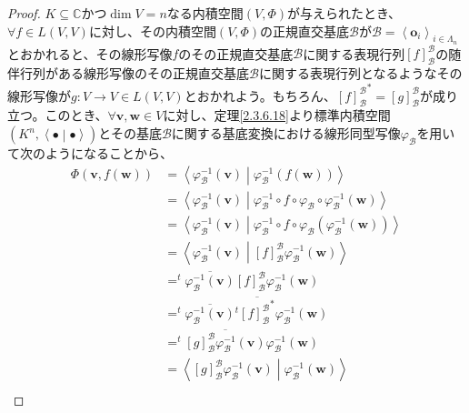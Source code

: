 \documentclass[dvipdfmx]{jsarticle}
\begin{document}
\begin{proof}
$K \subseteq \mathbb{C}$かつ$\dim V = n$なる内積空間$(V,\varPhi)$が与えられたとき、$\forall f \in L(V,V)$に対し、その内積空間$(V,\varPhi)$の正規直交基底$\mathcal{B}$が$\mathcal{B}=\left\langle \mathbf{o}_{i} \right\rangle_{i \in \varLambda_{n}}$とおかれると、その線形写像$f$のその正規直交基底$\mathcal{B}$に関する表現行列$[ f]_{\mathcal{B}}^{\mathcal{B}}$の随伴行列がある線形写像のその正規直交基底$\mathcal{B}$に関する表現行列となるようなその線形写像が$g:V \rightarrow V \in L(V,V)$とおかれよう。もちろん、${[ f]_{\mathcal{B}}^{\mathcal{B}}}^{*} = [ g]_{\mathcal{B}}^{\mathcal{B}}$が成り立つ。このとき、$\forall\mathbf{v},\mathbf{w} \in V$に対し、定理\ref{2.3.6.18}より標準内積空間$\left( K^{n},\left\langle \bullet \middle| \bullet \right\rangle \right)$とその基底$\mathcal{B}$に関する基底変換における線形同型写像$\varphi_{\mathcal{B}}$を用いて次のようになることから、
\begin{align*}
\varPhi\left( \mathbf{v},f\left( \mathbf{w} \right) \right) &= \left\langle \varphi_{\mathcal{B}}^{- 1}\left( \mathbf{v} \right) \middle| \varphi_{\mathcal{B}}^{- 1}\left( f\left( \mathbf{w} \right) \right) \right\rangle\\
&= \left\langle \varphi_{\mathcal{B}}^{- 1}\left( \mathbf{v} \right) \middle| \varphi_{\mathcal{B}}^{- 1} \circ f \circ \varphi_{\mathcal{B}} \circ \varphi_{\mathcal{B}}^{- 1}\left( \mathbf{w} \right) \right\rangle\\
&= \left\langle \varphi_{\mathcal{B}}^{- 1}\left( \mathbf{v} \right) \middle| \varphi_{\mathcal{B}}^{- 1} \circ f \circ \varphi_{\mathcal{B}}\left( \varphi_{\mathcal{B}}^{- 1}\left( \mathbf{w} \right) \right) \right\rangle\\
&= \left\langle \varphi_{\mathcal{B}}^{- 1}\left( \mathbf{v} \right) \middle| [ f]_{\mathcal{B}}^{\mathcal{B}}\varphi_{\mathcal{B}}^{- 1}\left( \mathbf{w} \right) \right\rangle\\
&=^{t}\overline{\varphi_{\mathcal{B}}^{- 1}\left( \mathbf{v} \right)}[ f]_{\mathcal{B}}^{\mathcal{B}}\varphi_{\mathcal{B}}^{- 1}\left( \mathbf{w} \right)\\
&=^{t}\overline{\varphi_{\mathcal{B}}^{- 1}\left( \mathbf{v} \right)}{}^{t}\overline{{[ f]_{\mathcal{B}}^{\mathcal{B}}}^{*}}\varphi_{\mathcal{B}}^{- 1}\left( \mathbf{w} \right)\\
&=^{t}\overline{[ g]_{\mathcal{B}}^{\mathcal{B}}\varphi_{\mathcal{B}}^{- 1}\left( \mathbf{v} \right)}\varphi_{\mathcal{B}}^{- 1}\left( \mathbf{w} \right)\\
&= \left\langle [ g]_{\mathcal{B}}^{\mathcal{B}}\varphi_{\mathcal{B}}^{- 1}\left( \mathbf{v} \right) \middle| \varphi_{\mathcal{B}}^{- 1}\left( \mathbf{w} \right) \right\rangle\\

\end{align*}
\end{proof}
\end{document}
